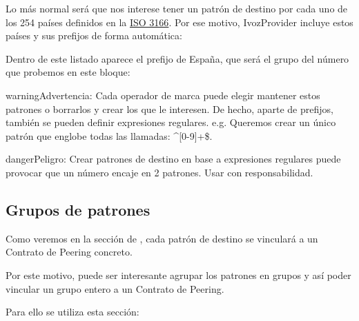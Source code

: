 \documentclass[letterpaper,10pt,spanish]{sphinxmanual}
\begin{document}

Lo más normal será que nos interese tener un patrón de destino por cada uno de los 254 países definidos en la \href{https://es.wikipedia.org/wiki/ISO\_3166}{ISO 3166}. Por ese motivo, IvozProvider incluye estos países y sus prefijos de forma automática:


Dentro de este listado aparece el prefijo de España, que será el grupo del número que probemos en este bloque:


\begin{notice}{warning}{Advertencia:}
Cada operador de marca puede elegir mantener estos patrones o borrarlos y crear los que le interesen. De hecho, aparte de prefijos, también se pueden definir expresiones regulares. e.g. Queremos crear un único patrón que englobe todas las llamadas: \textasciicircum{}{[}0-9{]}+\$.
\end{notice}

\begin{notice}{danger}{Peligro:}
Crear patrones de destino en base a expresiones regulares puede provocar que un número encaje en 2 patrones. Usar con responsabilidad.
\end{notice}


\subsection{Grupos de patrones}
\label{external_outgoing_calls/call_types:grupos-de-patrones}
Como veremos en la sección de {\hyperref[external_outgoing_calls/call_routing:outgoing\string-routes]{}}, cada patrón de destino se vinculará a un Contrato de Peering concreto.

Por este motivo, puede ser interesante agrupar los patrones en grupos y así poder vincular un grupo entero a un Contrato de Peering.

Para ello se utiliza esta sección:
\end{document}
